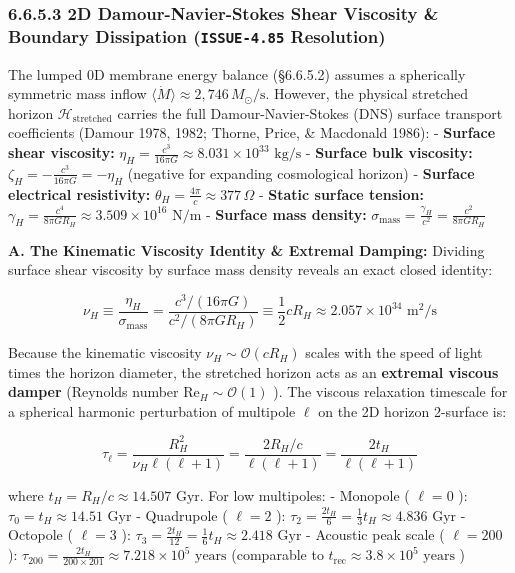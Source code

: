 \documentclass[11pt,a4paper]{article}
\theoremstyle{definition}
\theoremstyle{remark}
\begin{document}
\subsubsection{6.6.5.3 2D Damour-Navier-Stokes Shear Viscosity \& Boundary Dissipation (\texttt{ISSUE-4.85} Resolution)}
The lumped 0D membrane energy balance (\S 6.6.5.2) assumes a spherically symmetric mass inflow $\langle\dot{M}\rangle \approx 2{,}746\,M_\odot/\text{s}$. However, the physical stretched horizon $\mathcal{H}_{\text{stretched}}$ carries the full Damour-Navier-Stokes (DNS) surface transport coefficients (Damour 1978, 1982; Thorne, Price, \& Macdonald 1986):
- \textbf{Surface shear viscosity:} $\eta_H = \frac{c^3}{16\pi G} \approx 8.031 \times 10^{33}\text{ kg/s}$
- \textbf{Surface bulk viscosity:} $\zeta_H = -\frac{c^3}{16\pi G} = -\eta_H$ (negative for expanding cosmological horizon)
- \textbf{Surface electrical resistivity:} $\theta_H = \frac{4\pi}{c} \approx 377\,\Omega$
- \textbf{Static surface tension:} $\gamma_H = \frac{c^4}{8\pi G R_H} \approx 3.509 \times 10^{16}\text{ N/m}$
- \textbf{Surface mass density:} $\sigma_{\text{mass}} = \frac{\gamma_H}{c^2} = \frac{c^2}{8\pi G R_H}$

\textbf{A. The Kinematic Viscosity Identity \& Extremal Damping:}
Dividing surface shear viscosity by surface mass density reveals an exact closed identity:


\begin{equation}
\nu_H \equiv \frac{\eta_H}{\sigma_{\text{mass}}} = \frac{c^3 / (16\pi G)}{c^2 / (8\pi G R_H)} \equiv \frac{1}{2} c R_H \approx 2.057 \times 10^{34}\text{ m}^2/\text{s}
\end{equation}


Because the kinematic viscosity $\nu_H \sim \mathcal{O}(c R_H)$ scales with the speed of light times the horizon diameter, the stretched horizon acts as an \textbf{extremal viscous damper} (Reynolds number $\mathrm{Re}_H \sim \mathcal{O}(1)$ ). The viscous relaxation timescale for a spherical harmonic perturbation of multipole $\ell$ on the 2D horizon 2-surface is:


\begin{equation}
\tau_\ell = \frac{R_H^2}{\nu_H \ell(\ell + 1)} = \frac{2 R_H / c}{\ell(\ell + 1)} = \frac{2 t_H}{\ell(\ell + 1)}
\end{equation}


where $t_H = R_H / c \approx 14.507\text{ Gyr}$. For low multipoles:
- Monopole ( $\ell = 0$ ): $\tau_0 = t_H \approx 14.51\text{ Gyr}$
- Quadrupole ( $\ell = 2$ ): $\tau_2 = \frac{2 t_H}{6} = \frac{1}{3} t_H \approx 4.836\text{ Gyr}$
- Octopole ( $\ell = 3$ ): $\tau_3 = \frac{2 t_H}{12} = \frac{1}{6} t_H \approx 2.418\text{ Gyr}$
- Acoustic peak scale ( $\ell = 200$ ): $\tau_{200} = \frac{2 t_H}{200 \times 201} \approx 7.218 \times 10^5\text{ years}$ (comparable to $t_{\text{rec}} \approx 3.8 \times 10^5\text{ years}$ )
\end{document}
